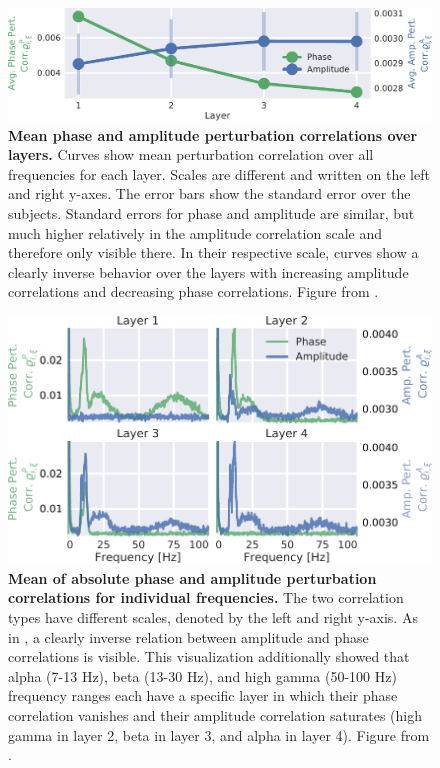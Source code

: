 \begin{figure}[htb]
    \myfloatalign
    \includegraphics[width=1\linewidth]{images/PhaseAmpDev_.pdf-1.png}
    
    \caption[Mean phase and amplitude perturbation correlations over layers]{
\textbf{Mean phase and amplitude perturbation correlations over layers.}
Curves show mean perturbation correlation over all frequencies for each
layer. Scales are different and written on the left and right y-axes.
The error bars show the standard error over the subjects. Standard
errors for phase and amplitude are similar, but much higher relatively
in the amplitude correlation scale and therefore only visible there. In
their respective scale, curves show a clearly inverse behavior over the
layers with increasing amplitude correlations and decreasing phase
correlations. Figure from \citet{hartmann2018hierarchical}.
}
\label{phase-amp-dev-layer-fig}
\end{figure}


\begin{figure}[htb]
    \myfloatalign
    \includegraphics[width=1\linewidth]{images/PhaseAmp.pdf-1.png}
    
    \caption[Mean of absolute phase and amplitude perturbation correlations
for individual frequencies]{
\textbf{Mean of absolute phase and amplitude perturbation correlations
for individual frequencies.} The two correlation types have different
scales, denoted by the left and right y-axis. As in
, a clearly inverse relation
between amplitude and phase correlations is visible. This visualization
additionally showed that alpha (7-13 Hz), beta (13-30 Hz), and high
gamma (50-100 Hz) frequency ranges each have a specific layer in which
their phase correlation vanishes and their amplitude correlation
saturates (high gamma in layer 2, beta in layer 3, and alpha in layer
4). Figure from \citet{hartmann2018hierarchical}.
}
\label{phase-amp-layer-fig}
\end{figure}


